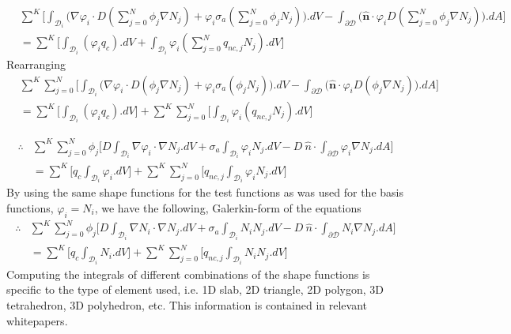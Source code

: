 \documentclass[11pt,letterpaper,titlepage]{article}
\newcommand{\bOmega}{\mathcal{D}}
\numberwithin{equation}{section}
\begin{document}
\begin{equation*}
\begin{aligned}
&\sum^K \biggr[
\int_{\bOmega_i} \biggr(
\nabla \varphi_i\cdot D (\sum_{j=0}^N \phi_j \nabla N_j)
+
\varphi_i\sigma_a  (\sum_{j=0}^N \phi_j N_j)
\biggr).dV
-
\int_{\partial \bOmega}\biggr( 
\mathbf{\hat{n}}\cdot \varphi_i D (\sum_{j=0}^N \phi_j \nabla N_j) 
\biggr). dA \biggr]
\\
&=\sum^K \biggr[
 \int_{\bOmega_i} (\varphi_i q_c).dV
 +
  \int_{\bOmega_i} \varphi_i (\sum_{j=0}^N q_{nc,j} N_j).dV 
  \biggr]
\end{aligned}
\end{equation*}
Rearranging
\begin{equation*}
\begin{aligned}
&\sum^K
\sum_{j=0}^N
 \biggr[
\int_{\bOmega_i} \biggr(
\nabla \varphi_i\cdot D ( \phi_j \nabla N_j)
+
\varphi_i\sigma_a  ( \phi_j N_j)
\biggr).dV
-
\int_{\partial \bOmega}\biggr( 
\mathbf{\hat{n}}\cdot \varphi_i D ( \phi_j \nabla N_j) 
\biggr). dA \biggr]
\\
&=\sum^K 
\biggr[
 \int_{\bOmega_i} (\varphi_i q_c).dV
\biggr]
 +
 \sum^K
 \sum_{j=0}^N
 \biggr[
  \int_{\bOmega_i} \varphi_i ( q_{nc,j} N_j).dV 
  \biggr]
\end{aligned}
\end{equation*}

\begin{equation*}
\begin{aligned}
\therefore
&\sum^K
\sum_{j=0}^N \phi_j
 \biggr[ 
D \int_{\bOmega_i} 
\nabla \varphi_i \cdot  \nabla N_j.dV
+
\sigma_a \int_{\bOmega_i}  \varphi_i N_j
.dV
-
D \ \hat{n} \cdot \int_{\partial \bOmega}
 \varphi_i \nabla N_j
. dA \biggr]
\\
&=\sum^K 
\biggr[q_c
 \int_{\bOmega_i} \varphi_i .dV 
 \biggr]
 +
 \sum^K
 \sum_{j=0}^N 
 \biggr[q_{nc,j}
  \int_{\bOmega_i} \varphi_i  N_j.dV 
  \biggr]
\end{aligned}
\end{equation*}
\newline
By using the same shape functions for the test functions as was used for the basis functions, $\varphi_i = N_i$, we have the following, Galerkin-form of the equations
\begin{equation}
\begin{aligned}
\therefore
&\sum^K
\sum_{j=0}^N \phi_j
 \biggr[ 
D \int_{\bOmega_i} 
\nabla N_i \cdot  \nabla N_j.dV
+
\sigma_a \int_{\bOmega_i}  N_i N_j
.dV
-
D \ \hat{n} \cdot \int_{\partial \bOmega}
 N_i \nabla N_j
. dA \biggr]
\\
&=\sum^K 
\biggr[q_c
 \int_{\bOmega_i} N_i .dV 
 \biggr]
 +
 \sum^K
 \sum_{j=0}^N 
 \biggr[q_{nc,j}
  \int_{\bOmega_i} N_i  N_j.dV 
  \biggr]
\end{aligned}
\end{equation}
\newline
Computing the integrals of different combinations of the shape functions is specific to the type of element used, i.e. 1D slab, 2D triangle, 2D polygon, 3D tetrahedron, 3D polyhedron, etc. This information is contained in relevant whitepapers.
\end{document}
